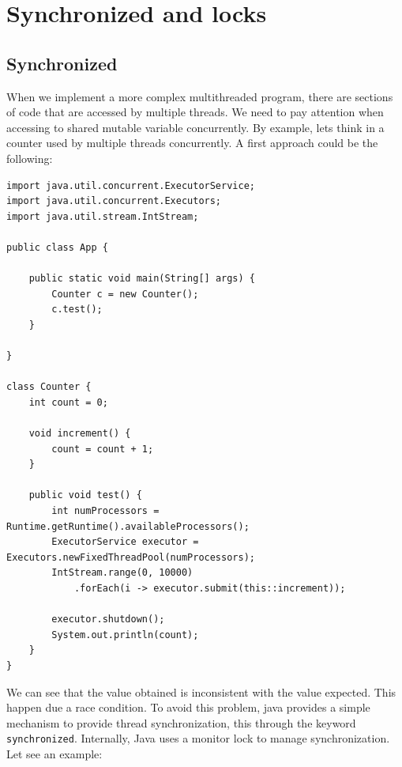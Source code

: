 \documentclass[openany, a4paper]{book}
\theoremstyle{break}
\theoremstyle{example}
\theoremstyle{note}
\theoremstyle{break}
\theoremstyle{exercise}
\begin{document}
\section{Synchronized and locks}
\label{sec:orgbff04db}


\subsection{Synchronized}
\label{sec:org7c8d04d}

When we implement a more complex multithreaded program, there are sections
of code that are accessed by multiple threads. We need to pay attention when
accessing to shared mutable variable concurrently. By example, lets think in
a counter used by multiple threads concurrently. A first approach could be
the following:

\begin{verbatim}
import java.util.concurrent.ExecutorService;
import java.util.concurrent.Executors;
import java.util.stream.IntStream;

public class App {

    public static void main(String[] args) {
        Counter c = new Counter();
        c.test();
    }

}

class Counter {
    int count = 0;

    void increment() {
        count = count + 1;
    }

    public void test() {
        int numProcessors = Runtime.getRuntime().availableProcessors();
        ExecutorService executor = Executors.newFixedThreadPool(numProcessors);
        IntStream.range(0, 10000)
            .forEach(i -> executor.submit(this::increment));

        executor.shutdown();
        System.out.println(count);
    }
}
\end{verbatim}

We can see that the value obtained is inconsistent with the value
expected. This happen due a race condition.  To avoid this problem, java
provides a simple mechanism to provide thread synchronization, this through
the keyword \texttt{synchronized}. Internally, Java uses a monitor lock to manage
synchronization. Let see an example:
\end{document}
